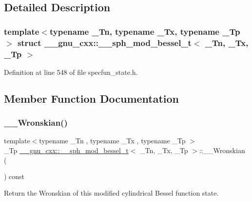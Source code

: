 \subsection{Detailed Description}
\subsubsection*{template$<$typename \+\_\+\+Tn, typename \+\_\+\+Tx, typename \+\_\+\+Tp$>$\newline
struct \+\_\+\+\_\+gnu\+\_\+cxx\+::\+\_\+\+\_\+sph\+\_\+mod\+\_\+bessel\+\_\+t$<$ \+\_\+\+Tn, \+\_\+\+Tx, \+\_\+\+Tp $>$}



Definition at line 548 of file specfun\+\_\+state.\+h.



\subsection{Member Function Documentation}
\mbox{\label{struct____gnu__cxx_1_1____sph__mod__bessel__t_afbe229c1b0faafc786c78eee38e52d0a}} 
\subsubsection{\texorpdfstring{\+\_\+\+\_\+\+Wronskian()}{\_\_Wronskian()}}
{\footnotesize\ttfamily template$<$typename \+\_\+\+Tn , typename \+\_\+\+Tx , typename \+\_\+\+Tp $>$ \\
\+\_\+\+Tp \hyperlink{struct____gnu__cxx_1_1____sph__mod__bessel__t}{\+\_\+\+\_\+gnu\+\_\+cxx\+::\+\_\+\+\_\+sph\+\_\+mod\+\_\+bessel\+\_\+t}$<$ \+\_\+\+Tn, \+\_\+\+Tx, \+\_\+\+Tp $>$\+::\+\_\+\+\_\+\+Wronskian (\begin{DoxyParamCaption}{ }\end{DoxyParamCaption}) const\hspace{0.3cm}{\ttfamily [inline]}}



Return the Wronskian of this modified cylindrical Bessel function state. 



